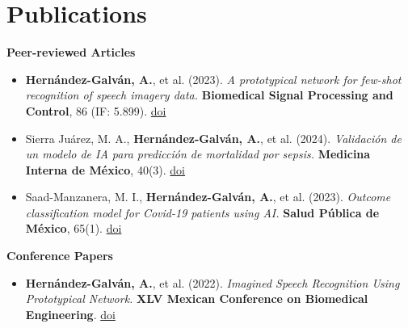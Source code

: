 \section*{Publications}

\textbf{Peer-reviewed Articles}
\begin{itemize}
    \item \textbf{Hernández-Galván, A.}, et al. (2023). \textit{A prototypical network for few-shot recognition of speech imagery data.} \textbf{Biomedical Signal Processing and Control}, 86 (IF: 5.899). \href{https://doi.org/10.1016/j.bspc.2023.105154}{doi}
    \item Sierra Juárez, M. A., \textbf{Hernández-Galván, A.}, et al. (2024). \textit{Validación de un modelo de IA para predicción de mortalidad por sepsis.} \textbf{Medicina Interna de México}, 40(3). \href{https://doi.org/10.24245/mim.v40i3.9023}{doi}
    \item Saad-Manzanera, M. I., \textbf{Hernández-Galván, A.}, et al. (2023). \textit{Outcome classification model for Covid-19 patients using AI.} \textbf{Salud Pública de México}, 65(1). \href{https://doi.org/10.21149/13547}{doi}
\end{itemize}

\textbf{Conference Papers}
\begin{itemize}
  \item \textbf{Hernández-Galván, A.}, et al. (2022). \textit{Imagined Speech Recognition Using Prototypical Network.} \textbf{XLV Mexican Conference on Biomedical Engineering}. \href{https://doi.org/10.1007/978-3-031-18256-3_4}{doi}
\end{itemize}